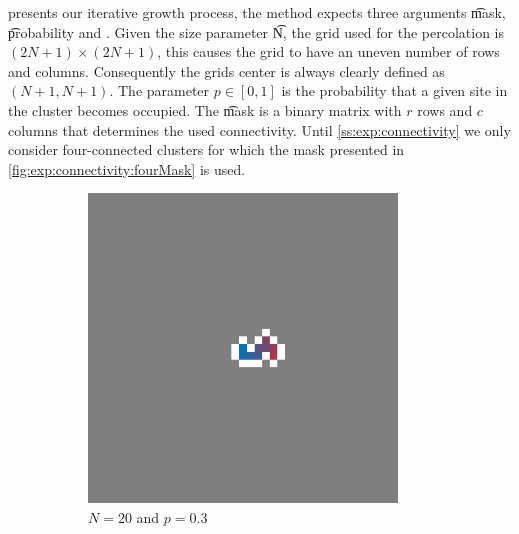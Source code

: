  presents our iterative growth process, the method  expects three arguments \t{mask}, \t{probability} and . Given the size parameter \t{N}, the grid used for the percolation is $(2N + 1) \times (2N + 1)$, this causes the grid to have an uneven number of rows and columns. Consequently the grids center is always clearly defined as $(N + 1, N + 1)$. The parameter $p \in [0, 1]$ is the probability that a given site in the cluster becomes occupied. The \t{mask} is a binary matrix with $r$ rows and $c$ columns that determines the used connectivity. Until \cref{ss:exp:connectivity} we only consider four-connected clusters for which the mask presented in \cref{fig:exp:connectivity:fourMask} is used.\\

\begin{figure}
	\centering	
	\begin{subfigure}{0.27\textwidth}
		\centering
		\includegraphics[width=0.9\textwidth]{./img/fancy_cluster_N20_p3_rng_8}
		\caption{$N = 20$ and $p = 0.3$}
		\label{fig:method:fin_inf:finiteSmall}
	\end{subfigure}
	\begin{subfigure}{0.27\textwidth}
		\centering

\end{subfigure}
\end{figure}
